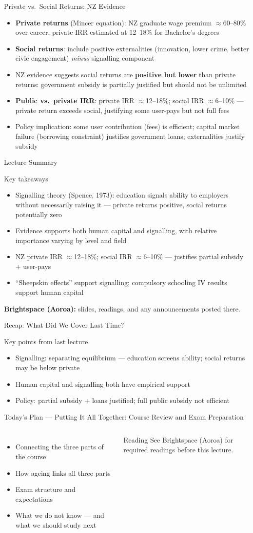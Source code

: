 \documentclass[aspectratio=169, 12pt]{beamer}
\newcommand{\recapslide}[1]{%
  \begin{frame}{Recap: What Did We Cover Last Time?}
    \begin{block}{Key points from last lecture}
      \begin{itemize}#1\end{itemize}
    \end{block}
  \end{frame}}
\newcommand{\planslide}[2]{%
  \begin{frame}{Today's Plan — #1}
    \begin{columns}
      \column{0.6\textwidth}
      \begin{itemize}#2\end{itemize}
      \column{0.38\textwidth}
      \begin{alertblock}{Reading}
        \footnotesize See Brightspace (Aoroa) for required readings before this lecture.
      \end{alertblock}
    \end{columns}
  \end{frame}}
\newcommand{\summaryside}[1]{%
  \begin{frame}{Lecture Summary}
    \begin{exampleblock}{Key takeaways}
      \begin{itemize}#1\end{itemize}
    \end{exampleblock}
    \vspace{0.5em}
    {\footnotesize\textcolor{OtagoGold}{\textbf{Brightspace (Aoroa):}} slides, readings, and any announcements posted there.}
  \end{frame}}
\begin{document}
\begin{frame}{Private vs.\ Social Returns: NZ Evidence}
  \begin{itemize}
    \item \textbf{Private returns} (Mincer equation): NZ graduate wage premium $\approx$60--80\%
          over career; private IRR estimated at 12--18\% for Bachelor's degrees
    \item \textbf{Social returns}: include positive externalities (innovation, lower crime,
          better civic engagement) \emph{minus} signalling component
    \item NZ evidence suggests social returns are \textbf{positive but lower} than private
          returns: government subsidy is partially justified but should not be unlimited
    \item \textbf{Public vs.\ private IRR}: private IRR $\approx$12--18\%; social IRR
          $\approx$6--10\% --- private return exceeds social, justifying some user-pays but
          not full fees
    \item Policy implication: some user contribution (fees) is efficient; capital market failure
          (borrowing constraint) justifies government loans; externalities justify subsidy
  \end{itemize}
\end{frame}

\summaryside{
  \item Signalling theory (Spence, 1973): education signals ability to employers without necessarily raising it --- private returns positive, social returns potentially zero
  \item Evidence supports both human capital and signalling, with relative importance varying by level and field
  \item NZ private IRR $\approx$12--18\%; social IRR $\approx$6--10\% --- justifies partial subsidy + user-pays
  \item ``Sheepskin effects'' support signalling; compulsory schooling IV results support human capital
}

\recapslide{
  \item Signalling: separating equilibrium --- education screens ability; social returns may be below private
  \item Human capital and signalling both have empirical support
  \item Policy: partial subsidy + loans justified; full public subsidy not efficient
}

\planslide{Putting It All Together: Course Review and Exam Preparation}{
  \item Connecting the three parts of the course
  \item How ageing links all three parts
  \item Exam structure and expectations
  \item What we do not know --- and what we should study next
}
\end{document}
